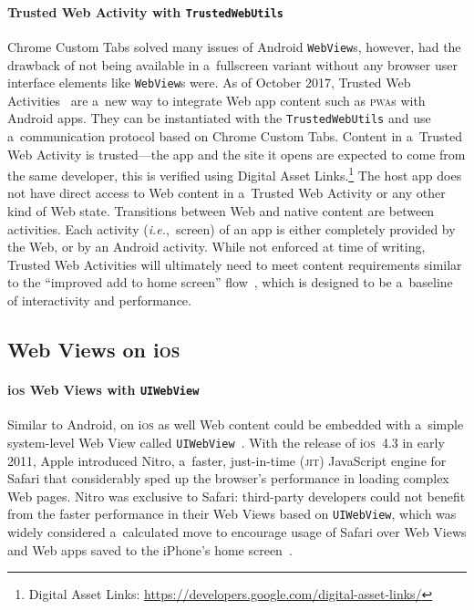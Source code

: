 \documentclass[sigconf]{acmart}
\begin{document}
\paragraph{Trusted Web Activity with \texttt{TrustedWebUtils}}

Chrome Custom Tabs solved many issues of Android \texttt{WebView}s,
however, had the drawback of not being available in a~fullscreen variant
without any browser user interface elements like \texttt{WebView}s were.
As of October 2017, Trusted Web Activities~\cite{googledevelopers2017twa} are a~new way to
integrate Web app content such as \textsc{pwa}s with Android apps.
They can be instantiated with the \texttt{TrustedWebUtils}
and use a~communication protocol based on Chrome Custom Tabs.
Content in a~Trusted Web Activity is trusted---the app and the site it opens
are expected to come from the same developer, this is verified using Digital Asset
Links.\footnote{Digital Asset Links:
\url{https://developers.google.com/digital-asset-links/}}
The host app does not have direct access to Web content in a~Trusted Web Activity
or any other kind of Web state.
Transitions between Web and native content are between activities.
Each activity (\emph{i.e.},\ screen) of an app is either completely provided by the Web,
or by an Android activity.
While not enforced at time of writing, Trusted Web Activities
will ultimately need to meet content requirements
similar to the ``improved add to home screen'' flow~\cite{kinlan2017a2hs},
which is designed to be a~baseline of interactivity and performance.

\subsection{Web Views on i\textsc{os}}

\paragraph{i\textsc{os} Web Views with \texttt{UIWebView}}

Similar to Android, on i\textsc{os} as well Web content could be embedded with
a~simple system-level Web View called \texttt{UIWebView}~\cite{apple2018uiwebview}.
With the release of i\textsc{os}~4.3 in early 2011, Apple introduced Nitro,
a~faster, just-in-time (\textsc{jit}) JavaScript engine for Safari
that considerably sped up the browser's performance in loading complex Web pages.
Nitro was exclusive to Safari: third-party developers could not benefit
from the faster performance in their Web Views based on \texttt{UIWebView},
which was widely considered a~calculated move to encourage usage of Safari
over Web Views and Web apps saved to the iPhone's home screen~\cite{viticci2015safari}.
\end{document}
